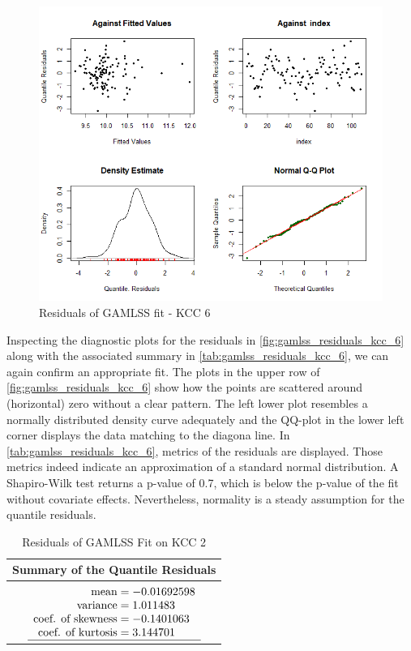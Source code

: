 \begin{figure}[H]
\centering
  \includegraphics[width=0.95\linewidth]{figures/gamlss_residuals_kcc_6.png}
  \caption{Residuals of GAMLSS fit - KCC 6}
  \label{fig:gamlss_residuals_kcc_6}
\end{figure}


Inspecting the diagnostic plots for the residuals in \autoref{fig:gamlss_residuals_kcc_6} along with the associated summary in \autoref{tab:gamlss_residuals_kcc_6}, we can again confirm an appropriate fit. The plots in the upper row of \autoref{fig:gamlss_residuals_kcc_6} show how the points are scattered around (horizontal) zero without a clear pattern. The left lower plot resembles a normally distributed density curve adequately and the QQ-plot in the lower left corner displays the data matching to the diagona line. In \autoref{tab:gamlss_residuals_kcc_6}, metrics of the residuals are displayed. Those metrics indeed indicate an approximation of a standard normal distribution.  A Shapiro-Wilk test returns a p-value of 0.7, which is below the p-value of the fit without covariate effects. Nevertheless, normality is a steady assumption for the quantile residuals.
\\






\begin{table}[H]
\centering
\begin{tabular}{c}
\hline
\rowcolor{white} 
\textbf{Summary of the Quantile Residuals} \\ \hline\hline
 $\begin{array}[t]{ r @{{}={}} l }
\text{mean} & -0.01692598                         \\ 
\text{variance} & 1.011483                         \\ 
\text{coef. of skewness} & -0.1401063               \\ 
\text{coef. of kurtosis} & 3.144701                \\ \hline
\end{array}$
\end{tabular}
\caption{Residuals of GAMLSS Fit on KCC 2}
\label{tab:gamlss_residuals_kcc_6}
\end{table}


